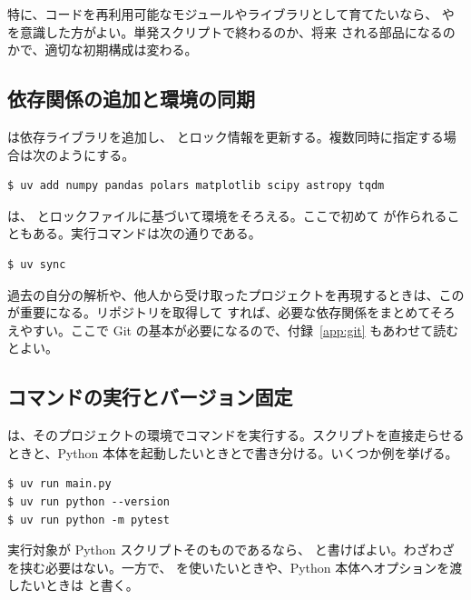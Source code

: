 特に、コードを再利用可能なモジュールやライブラリとして育てたいなら、 や  を意識した方がよい。単発スクリプトで終わるのか、将来  される部品になるのかで、適切な初期構成は変わる。

\subsection{依存関係の追加と環境の同期}

 は依存ライブラリを追加し、 とロック情報を更新する。複数同時に指定する場合は次のようにする。

\begin{lstlisting}[numbers=none, xleftmargin=2\zw]
$ uv add numpy pandas polars matplotlib scipy astropy tqdm
\end{lstlisting}



 は、 とロックファイルに基づいて環境をそろえる。ここで初めて  が作られることもある。実行コマンドは次の通りである。

\begin{lstlisting}[numbers=none, xleftmargin=2\zw]
$ uv sync
\end{lstlisting}

過去の自分の解析や、他人から受け取ったプロジェクトを再現するときは、この  が重要になる。リポジトリを取得して  すれば、必要な依存関係をまとめてそろえやすい。ここで Git の基本が必要になるので、付録~\ref{app:git} もあわせて読むとよい。

\subsection{コマンドの実行とバージョン固定}

 は、そのプロジェクトの環境でコマンドを実行する。スクリプトを直接走らせるときと、Python 本体を起動したいときとで書き分ける。いくつか例を挙げる。

\begin{lstlisting}[numbers=none, xleftmargin=2\zw]
$ uv run main.py
$ uv run python --version
$ uv run python -m pytest
\end{lstlisting}

実行対象が Python スクリプトそのものであるなら、 と書けばよい。わざわざ  を挟む必要はない。一方で、 を使いたいときや、Python 本体へオプションを渡したいときは  と書く。



